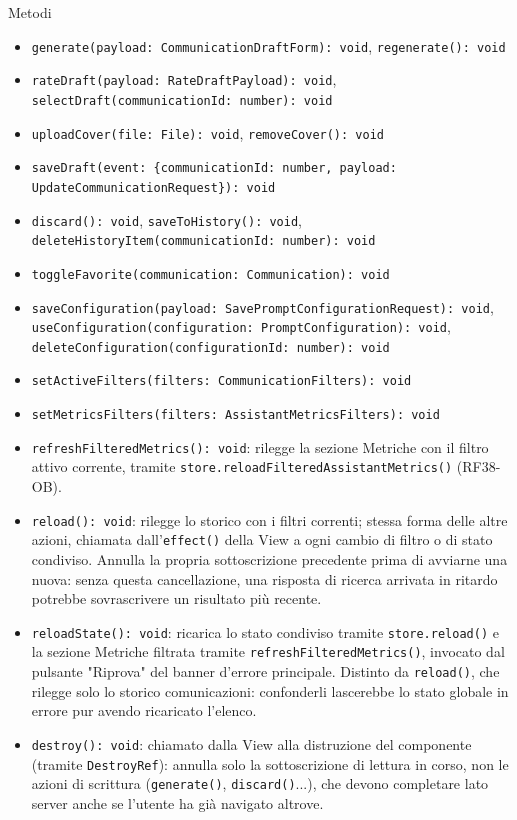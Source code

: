 \documentclass[a4paper,12pt]{article}
\begin{document}
\begin{sloppypar}
Metodi
\begin{itemize}\raggedright
    \item \texttt{generate(payload: CommunicationDraftForm): void}, \texttt{regenerate(): void}
    \item \texttt{rateDraft(payload: RateDraftPayload): void}, \texttt{selectDraft(communicationId: number): void}
    \item \texttt{uploadCover(file: File): void}, \texttt{removeCover(): void}
    \item \texttt{saveDraft(event: \{communicationId: number, payload: UpdateCommunicationRequest\}): void}
    \item \texttt{discard(): void}, \texttt{saveToHistory(): void}, \texttt{deleteHistoryItem(communicationId: number): void}
    \item \texttt{toggleFavorite(communication: Communication): void}
    \item \texttt{saveConfiguration(payload: SavePromptConfigurationRequest): void}, \texttt{useConfiguration(configuration: PromptConfiguration): void}, \texttt{deleteConfiguration(configurationId: number): void}
    \item \texttt{setActiveFilters(filters: CommunicationFilters): void}
    \item \texttt{setMetricsFilters(filters: AssistantMetricsFilters): void}
    \item \texttt{refreshFilteredMetrics(): void}: rilegge la sezione Metriche con il filtro attivo corrente, tramite \texttt{store.reloadFilteredAssistantMetrics()} (RF38-OB).
    \item \texttt{reload(): void}: rilegge lo storico con i filtri correnti; stessa forma delle altre azioni, chiamata dall'\texttt{effect()} della View a ogni cambio di filtro o di stato condiviso. Annulla la propria sottoscrizione precedente prima di avviarne una nuova: senza questa cancellazione, una risposta di ricerca arrivata in ritardo potrebbe sovrascrivere un risultato più recente.
    \item \texttt{reloadState(): void}: ricarica lo stato condiviso tramite \texttt{store.reload()} e la sezione Metriche filtrata tramite \texttt{refreshFilteredMetrics()}, invocato dal pulsante "Riprova" del banner d'errore principale. Distinto da \texttt{reload()}, che rilegge solo lo storico comunicazioni: confonderli lascerebbe lo stato globale in errore pur avendo ricaricato l'elenco.
    \item \texttt{destroy(): void}: chiamato dalla View alla distruzione del componente (tramite \texttt{DestroyRef}): annulla solo la sottoscrizione di lettura in corso, non le azioni di scrittura (\texttt{generate()}, \texttt{discard()}...), che devono completare lato server anche se l'utente ha già navigato altrove.
\end{itemize}


\end{sloppypar}
\end{document}
